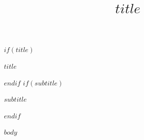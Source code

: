 \documentclass[
  fontsize=12pt,       %
  paper=letter,        %
  headings=normal,     %
  parskip=half,        %
  twoside=false,       %
  titlepage=false      %
]{scrbook}
\title{$title$}      %
\begin{document}
\begin{center}
  $if(title)$
    {\LARGE\sffamily\bfseries $title$\par}
  $endif$
  \vspace{1em}
  $if(subtitle)$
    {\large $subtitle$\par}
  $endif$
\end{center}         %

\thispagestyle{empty}  %

$body$                 %
\end{document}
